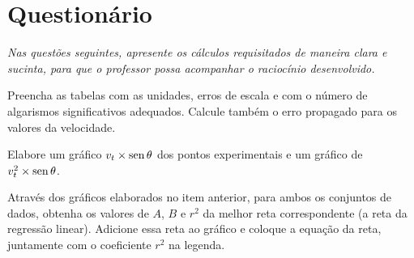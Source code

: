 \begin{fullwidth}
\noindent{}
\vspace{5mm}

\noindent{}

\noindent{}

\noindent{}

\noindent{}

\noindent{}
\end{fullwidth}

\vspace{5mm}

\section{Questionário}
\emph{Nas questões seguintes, apresente os cálculos requisitados de maneira clara e sucinta, para que o professor possa acompanhar o raciocínio desenvolvido.}
\vspace{5mm}

\begin{question}[type={exam}]{3}
Preencha as tabelas com as unidades, erros de escala e com o número de algarismos significativos adequados. Calcule também o erro propagado para os valores da velocidade.
\end{question}

\begin{question}[type={exam}]{2.5}
Elabore um gráfico $v_t \times \operatorname{sen}\theta$ dos pontos experimentais e um gráfico de $v_t^2 \times \operatorname{sen}\theta$.
\end{question}

\begin{question}[type={exam}]{2.5}
Através dos gráficos elaborados no item anterior, para ambos os conjuntos de dados, obtenha os valores de $A$, $B$ e $r^2$ da melhor reta correspondente (a reta da regressão linear). Adicione essa reta ao gráfico e coloque a equação da reta, juntamente com o coeficiente $r^2$ na legenda.
\end{question}

